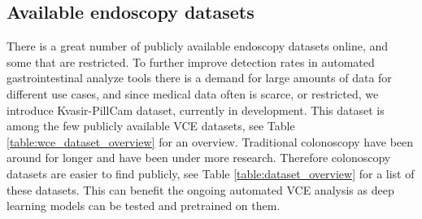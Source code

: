 \documentclass[thesis.tex]{subfiles}
\begin{document}
\subsection{Available endoscopy datasets}
There is a great number of publicly available endoscopy datasets online, and some that are restricted. To further improve detection rates in automated gastrointestinal analyze tools there is a demand for large amounts of data for different use cases, and since medical data often is scarce, or restricted, we introduce Kvasir-PillCam dataset, currently in development. This dataset is among the few publicly available VCE datasets, see Table \ref{table:wce_dataset_overview} for an overview. 
Traditional colonoscopy have been around for longer and have been under more research. Therefore colonoscopy datasets are easier to find publicly, see Table \ref{table:dataset_overview} for a list of these datasets. This can benefit the ongoing automated VCE analysis as deep learning models can be tested and pretrained on them.
\end{document}
